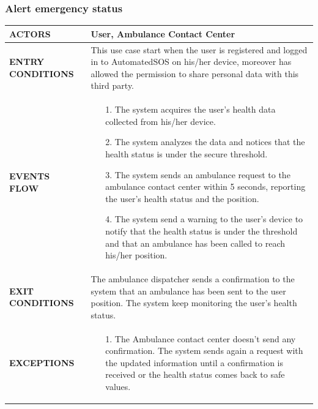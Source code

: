 \documentclass[a4paper]{article}
\begin{document}
\subsubsection{Alert emergency status}
\begin{center}
    \begin{tabular}{l || p{8cm} ||}
        \bf{ACTORS} & User, Ambulance Contact Center \\ \hline
        \bf{ENTRY CONDITIONS} & This use case start when the user is registered and logged in to AutomatedSOS on his/her device, moreover has allowed the permission to share personal data with this third party. \\ \hline
        \bf{EVENTS FLOW} & \begin{itemize}[noitemsep, topsep=0cm, leftmargin=*] \vspace{-0.2cm}
            \item[1.] The system acquires the user's health data collected from his/her device.
            \item[2.] The system analyzes the data and notices that the health status is under the secure threshold.
            \item[3.] The system sends an ambulance request to the ambulance contact center within 5 seconds, reporting the user's health status and the position.
            \item[4.] The system send a warning to the user's device to notify that the health status is under the threshold and that an ambulance has been called to reach his/her position.
        \end{itemize}
        \\ \hline
        \bf{EXIT CONDITIONS} & The ambulance dispatcher sends a confirmation to the system that an ambulance has been sent to the user position. The system keep monitoring the user's health status.  \\ \hline
        \bf{EXCEPTIONS} & \begin{itemize}[noitemsep, topsep=0cm, leftmargin=*] \vspace{-0.2cm}
            \item[1.] The Ambulance contact center doesn't send any confirmation. The system sends again a request with the updated information until a confirmation is received or the health status comes back to safe values.
        \end{itemize}
        \\ \hline \hline
    \end{tabular}
\end{center}
\end{document}
